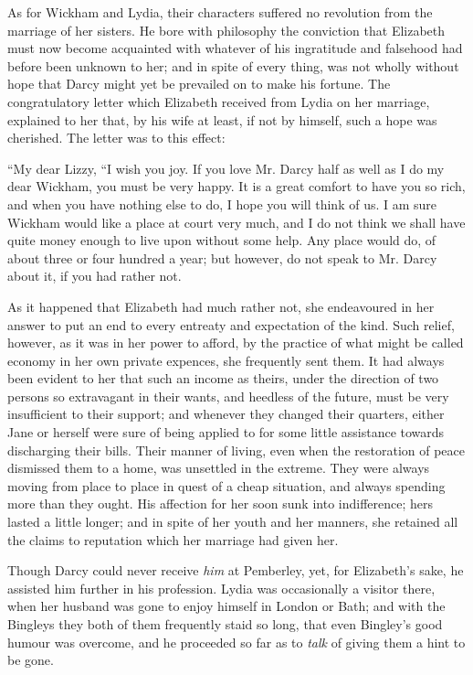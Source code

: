 As for Wickham and Lydia, their characters suffered no revolution from the marriage of her sisters. He bore with philosophy the conviction that Elizabeth must now become acquainted with whatever of his ingratitude and falsehood had before been unknown to her; and in spite of every thing, was not wholly without hope that Darcy might yet be prevailed on to make his fortune. The congratulatory letter which Elizabeth received from Lydia on her marriage, explained to her that, by his wife at least, if not by himself, such a hope was cherished. The letter was to this effect:

“My dear Lizzy,\crlf
“I wish you joy. If you love Mr. Darcy half as well as I do my dear Wickham, you must be very happy. It is a great comfort to have you so rich, and when you have nothing else to do, I hope you will think of us. I am sure Wickham would like a place at court very much, and I do not think we shall have quite money enough to live upon without some help. Any place would do, of about three or four hundred a year; but however, do not speak to Mr. Darcy about it, if you had rather not.


As it happened that Elizabeth had much rather not, she endeavoured in her answer to put an end to every entreaty and expectation of the kind. Such relief, however, as it was in her power to afford, by the practice of what might be called economy in her own private expences, she frequently sent them. It had always been evident to her that such an income as theirs, under the direction of two persons so extravagant in their wants, and heedless of the future, must be very insufficient to their support; and whenever they changed their quarters, either Jane or herself were sure of being applied to for some little assistance towards discharging their bills. Their manner of living, even when the restoration of peace dismissed them to a home, was unsettled in the extreme. They were always moving from place to place in quest of a cheap situation, and always spending more than they ought. His affection for her soon sunk into indifference; hers lasted a little longer; and in spite of her youth and her manners, she retained all the claims to reputation which her marriage had given her.

Though Darcy could never receive {\em him} at Pemberley, yet, for Elizabeth's sake, he assisted him further in his profession. Lydia was occasionally a visitor there, when her husband was gone to enjoy himself in London or Bath; and with the Bingleys they both of them frequently staid so long, that even Bingley's good humour was overcome, and he proceeded so far as to {\em talk} of giving them a hint to be gone.

